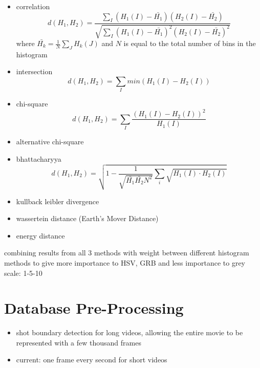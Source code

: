 \begin{itemize}
    \item correlation
    \begin{equation}
        d(H_1,H_2)=\frac{\sum _I(H_1(I)-\bar{H_1})(H_2(I)-\bar{H_2})}{\sqrt{\sum _I(H_1(I)-\bar{H_1})^2(H_2(I)-\bar{H_2})^2}}
    \end{equation}
    where $\bar{H_k}=\frac{1}{N}\sum_JH_k(J)$ and $N$ is equal to the total number of bins in the histogram
    \item intersection
    \begin{equation}
        d(H_1,H_2)=\sum_Imin(H_1(I)-H_2(I))
    \end{equation}
    \item chi-square
    \begin{equation}
        d(H_1,H_2)=\sum_I\frac{(H_1(I)-H_2(I))^2}{H_1(I)}
    \end{equation}
    \item alternative chi-square
    \item bhattacharyya
    \begin{equation}
        d(H_1,H_2)=\sqrt{1-\frac{1}{\sqrt{\bar{H_1}\bar{H_2}N^2}}\sum_i\sqrt{H_1(I)\cdot H_2(I)}}
    \end{equation}
    \item kullback leibler divergence
    \item wassertein distance (Earth's Mover Distance)
    \item energy distance
\end{itemize}

combining results from all 3 methods with weight between different histogram methods to give more importance to HSV, GRB and less importance to grey scale: 1-5-10


\section{Database Pre-Processing}

\begin{itemize}
    \item shot boundary detection for long videos, allowing the entire movie to be represented with a few thousand frames
    \item current: one frame every second for short videos
\end{itemize}

